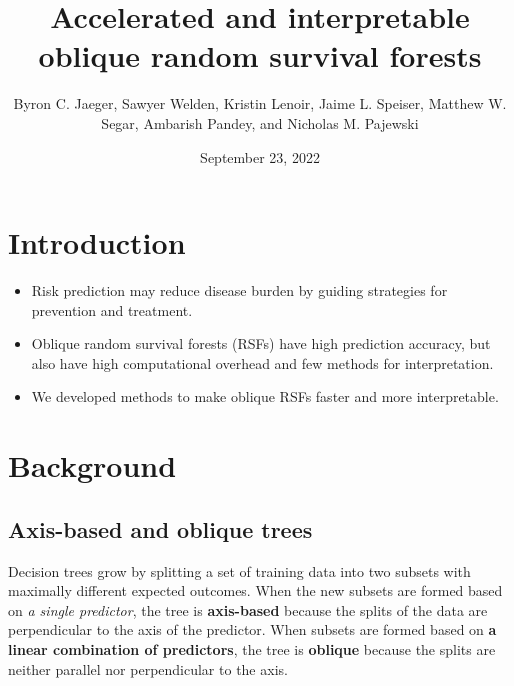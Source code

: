 \documentclass[final]{beamer}\usepackage[]{graphicx}\usepackage[]{xcolor}
\title
[Wake Forest Biomedical Informatics Colloquium 2022] %
{ %
Accelerated and interpretable oblique random survival forests
}
\author{ %
Byron C. Jaeger\inst{1}, Sawyer Welden\inst{1}, Kristin Lenoir\inst{1}, Jaime L. Speiser\inst{1}, Matthew W. Segar\inst{2}, Ambarish Pandey\inst{3}, and Nicholas M. Pajewski\inst{1}
}
\institute
[Wake Forest University School of Medicine] %
{
\inst{1} Wake Forest University School of Medicine, Winston-Salem NC\\[0.3ex]
\inst{2} Texas Heart Institute, Houston TX\\[0.3ex]
\inst{3} University of Texas Southwestern Medical Center, Dallas TX
}
\date{September 23, 2022}
\begin{document}
\begin{frame}[t]
\begin{multicols}{3}

\section{Introduction}

\begin{itemize}

\item Risk prediction may reduce disease burden by guiding strategies for prevention and treatment.

\item Oblique random survival forests (RSFs) have high prediction accuracy, but also have high computational overhead and few methods for interpretation.\cite{ref1}

\item We developed methods to make oblique RSFs faster and more interpretable.

\end{itemize}



\section{Background}

\subsection{Axis-based and oblique trees}

Decision trees grow by splitting a set of training data into two subsets with maximally different expected outcomes. When the new subsets are formed based on \emph{a single predictor}, the tree is \textbf{axis-based} because the splits of the data are perpendicular to the axis of the predictor. When subsets are formed based on \textbf{a linear combination of predictors}, the tree is \textbf{oblique} because the splits are neither parallel nor perpendicular to the axis.


\end{multicols}
\end{frame}
\end{document}
